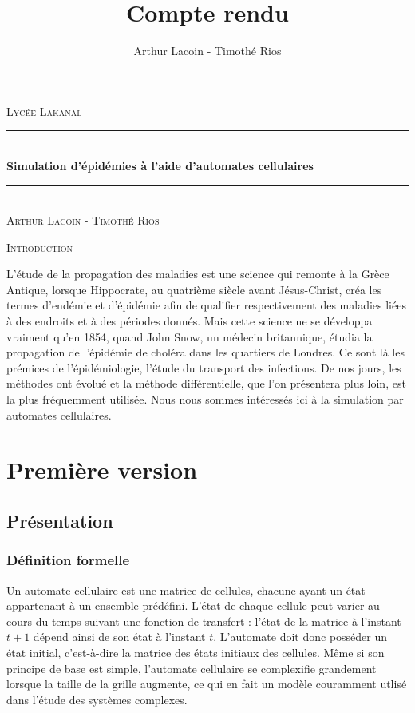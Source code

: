 \documentclass{article}
\title{Compte rendu}
\author{Arthur Lacoin - Timothé Rios}
\date{}
\newcommand{\HRule}{\rule{\linewidth}{0.5mm}}
\begin{document}
\begin{titlepage}
    \begin{sffamily}
    \begin{center}

        \textsc{\LARGE Lycée Lakanal}~\\[2cm]

        \HRule \\[0.4cm]
        { \huge \bfseries Simulation d'épidémies à l'aide d'automates cellulaires\\[0.4cm] }
        \HRule \\[2cm]
        \textsc{\Large Arthur Lacoin - Timothé Rios}\\[2cm]

    \end{center}
\end{sffamily}
\end{titlepage}

\tableofcontents

\newpage

\begin{center}
\textsc{Introduction}~\\[1cm]
\end{center}

	L'étude de la propagation des maladies est une science qui remonte à la Grèce Antique, lorsque Hippocrate, au quatrième siècle avant Jésus-Christ, créa les termes d'endémie et d'épidémie afin de qualifier respectivement des maladies liées à des endroits et à des périodes donnés. Mais cette science ne se développa vraiment qu'en 1854, quand John Snow, un médecin britannique, étudia la propagation de l'épidémie de choléra dans les quartiers de Londres. Ce sont là les prémices de l'épidémiologie, l'étude du transport des infections. De nos jours, les méthodes ont évolué et la méthode différentielle, que l'on présentera plus loin, est la plus fréquemment utilisée. Nous nous sommes intéressés ici à la simulation par automates cellulaires.

\section{Première version}

\subsection{Présentation}
\subsubsection{Définition formelle}
	Un automate cellulaire est une matrice de cellules, chacune ayant un état appartenant à un ensemble prédéfini. L'état de chaque cellule peut varier au cours du temps suivant une fonction de transfert : l'état de la matrice à l'instant $t+1$ dépend ainsi de son état à l'instant $t$. L'automate doit donc posséder un état initial, c'est-à-dire la matrice des états initiaux des cellules. Même si son principe de base est simple, l'automate cellulaire se complexifie grandement lorsque la taille de la grille augmente, ce qui en fait un modèle couramment utlisé dans l'étude des systèmes complexes.
\end{document}
